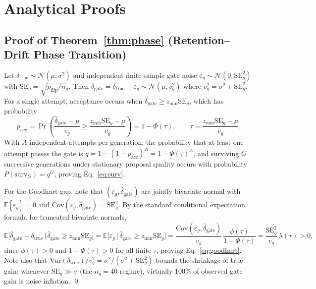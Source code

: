 \documentclass[10pt]{article}
\begin{document}
\clearpage
\appendix

\section{Analytical Proofs}
\label{app:proofs}

\subsection{Proof of Theorem~\ref{thm:phase} (Retention--Drift Phase Transition)}
Let $\delta_{\mathrm{true}} \sim \mathcal{N}(\mu, \sigma^2)$ and independent finite-sample gate noise $\varepsilon_g \sim \mathcal{N}(0, \mathrm{SE}_g^2)$ with $\mathrm{SE}_g = \sqrt{p_{\mathrm{flip}}/n_g}$. Then $\hat{\delta}_{\mathrm{gate}} = \delta_{\mathrm{true}} + \varepsilon_g \sim \mathcal{N}(\mu, v_g^2)$ where $v_g^2 = \sigma^2 + \mathrm{SE}_g^2$. For a single attempt, acceptance occurs when $\hat{\delta}_{\mathrm{gate}} \ge z_{\min}\mathrm{SE}_g$, which has probability
\[
p_{\mathrm{acc}} = \Pr\left(\frac{\hat{\delta}_{\mathrm{gate}} - \mu}{v_g} \ge \frac{z_{\min}\mathrm{SE}_g - \mu}{v_g}\right) = 1 - \Phi(\tau), \qquad \tau = \frac{z_{\min}\mathrm{SE}_g - \mu}{v_g}.
\]
With $A$ independent attempts per generation, the probability that at least one attempt passes the gate is $q = 1 - (1 - p_{\mathrm{acc}})^A = 1 - \Phi(\tau)^A$, and surviving $G$ successive generations under stationary proposal quality occurs with probability $P(\mathrm{surv}_G) = q^G$, proving Eq.~\eqref{eq:surv}.

For the Goodhart gap, note that $(\varepsilon_g, \hat{\delta}_{\mathrm{gate}})$ are jointly bivariate normal with $\mathbb{E}[\varepsilon_g] = 0$ and $\mathrm{Cov}(\varepsilon_g, \hat{\delta}_{\mathrm{gate}}) = \mathrm{SE}_g^2$. By the standard conditional expectation formula for truncated bivariate normals,
\[
\mathbb{E}\bigl[\hat{\delta}_{\mathrm{gate}} - \delta_{\mathrm{true}} \,\big|\, \hat{\delta}_{\mathrm{gate}} \ge z_{\min}\mathrm{SE}_g\bigr]
= \mathbb{E}\bigl[\varepsilon_g \,\big|\, \hat{\delta}_{\mathrm{gate}} \ge z_{\min}\mathrm{SE}_g\bigr]
= \frac{\mathrm{Cov}(\varepsilon_g, \hat{\delta}_{\mathrm{gate}})}{v_g}\,\frac{\phi(\tau)}{1 - \Phi(\tau)}
= \frac{\mathrm{SE}_g^2}{v_g}\,\lambda(\tau) > 0,
\]
since $\phi(\tau) > 0$ and $1 - \Phi(\tau) > 0$ for all finite $\tau$, proving Eq.~\eqref{eq:goodhart}. Note also that $\mathrm{Var}(\delta_{\mathrm{true}}) / v_g^2 = \sigma^2/(\sigma^2 + \mathrm{SE}_g^2)$ bounds the shrinkage of true gain: whenever $\mathrm{SE}_g \gg \sigma$ (the $n_g=40$ regime), virtually 100\% of observed gate gain is noise inflation. \qed
\end{document}

